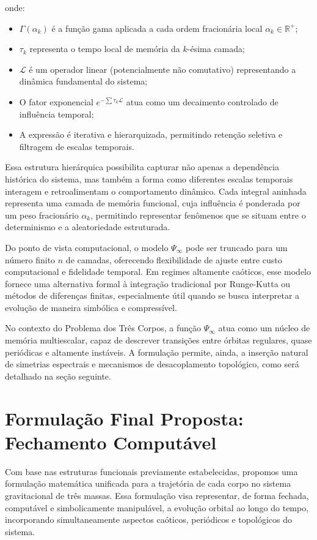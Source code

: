 \documentclass[12pt]{article}
\begin{document}
onde:
\begin{itemize}
    \item \( \Gamma(\alpha_k) \) é a função gama aplicada a cada ordem fracionária local \( \alpha_k \in \mathbb{R}^+ \);
    \item \( \tau_k \) representa o tempo local de memória da $k$-ésima camada;
    \item \( \mathcal{L} \) é um operador linear (potencialmente não comutativo) representando a dinâmica fundamental do sistema;
    \item O fator exponencial \( e^{-\sum \tau_k \mathcal{L}} \) atua como um decaimento controlado de influência temporal;
    \item A expressão é iterativa e hierarquizada, permitindo retenção seletiva e filtragem de escalas temporais.
\end{itemize}

Essa estrutura hierárquica possibilita capturar não apenas a dependência histórica do sistema, mas também a forma como diferentes escalas temporais interagem e retroalimentam o comportamento dinâmico. Cada integral aninhada representa uma camada de memória funcional, cuja influência é ponderada por um peso fracionário \(\alpha_k\), permitindo representar fenômenos que se situam entre o determinismo e a aleatoriedade estruturada.

Do ponto de vista computacional, o modelo \(\Psi_\infty\) pode ser truncado para um número finito \(n\) de camadas, oferecendo flexibilidade de ajuste entre custo computacional e fidelidade temporal. Em regimes altamente caóticos, esse modelo fornece uma alternativa formal à integração tradicional por Runge-Kutta ou métodos de diferenças finitas, especialmente útil quando se busca interpretar a evolução de maneira simbólica e compressível.

No contexto do Problema dos Três Corpos, a função \(\Psi_\infty\) atua como um núcleo de memória multiescalar, capaz de descrever transições entre órbitas regulares, quase periódicas e altamente instáveis. A formulação permite, ainda, a inserção natural de simetrias espectrais e mecanismos de desacoplamento topológico, como será detalhado na seção seguinte.


\section{Formulação Final Proposta: Fechamento Computável}

Com base nas estruturas funcionais previamente estabelecidas, propomos uma formulação matemática unificada para a trajetória de cada corpo no sistema gravitacional de três massas. Essa formulação visa representar, de forma fechada, computável e simbolicamente manipulável, a evolução orbital ao longo do tempo, incorporando simultaneamente aspectos caóticos, periódicos e topológicos do sistema.
\end{document}
